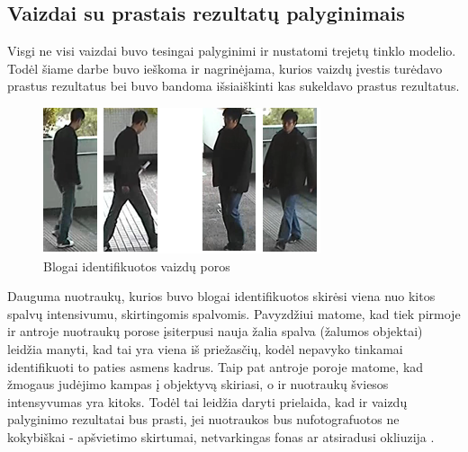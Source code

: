 \documentclass{VUMIFPSkursinis}
\begin{document}
\pagebreak

\subsection{Vaizdai su prastais rezultatų palyginimais}
Visgi ne visi vaizdai buvo tesingai palyginimi ir nustatomi trejetų tinklo modelio. Todėl šiame darbe buvo ieškoma ir nagrinėjama, kurios vaizdų įvestis turėdavo prastus rezultatus bei buvo bandoma išsiaiškinti kas sukeldavo prastus rezultatus.

\begin{figure}[H]
\centering
\includegraphics[scale=1.0]{img/Wrongly_detected.png}
\caption{Blogai identifikuotos vaizdų poros} %
\label{img:mlp}
\end{figure}

Dauguma nuotraukų, kurios buvo blogai identifikuotos skirėsi viena nuo kitos spalvų intensivumu, skirtingomis spalvomis. Pavyzdžiui matome, kad tiek pirmoje ir antroje nuotraukų porose įsiterpusi nauja žalia spalva (žalumos objektai) leidžia manyti, kad tai yra viena iš priežasčių, kodėl nepavyko tinkamai identifikuoti to paties asmens kadrus. Taip pat antroje poroje matome, kad žmogaus judėjimo kampas į objektyvą skiriasi, o ir nuotraukų šviesos intensyvumas yra kitoks. Todėl tai leidžia daryti prielaida, kad ir vaizdų palyginimo rezultatai bus prasti, jei nuotraukos bus nufotografuotos ne kokybiškai - apšvietimo skirtumai, netvarkingas fonas ar atsiradusi okliuzija \cite{Person_reindentification}.
\end{document}
